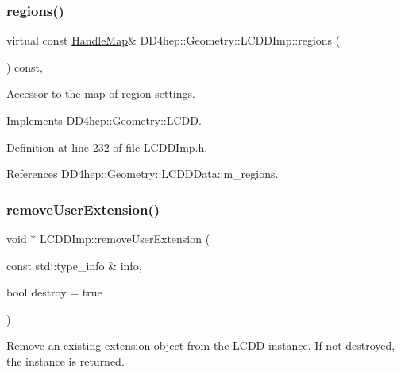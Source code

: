 \subsubsection{\texorpdfstring{regions()}{regions()}}
{\footnotesize\ttfamily virtual const \hyperlink{class_d_d4hep_1_1_geometry_1_1_l_c_d_d_a05cb11e7355772c7b0794bcca59bf477}{Handle\+Map}\& D\+D4hep\+::\+Geometry\+::\+L\+C\+D\+D\+Imp\+::regions (\begin{DoxyParamCaption}{ }\end{DoxyParamCaption}) const\hspace{0.3cm}{\ttfamily [inline]}, {\ttfamily [virtual]}}



Accessor to the map of region settings. 



Implements \hyperlink{class_d_d4hep_1_1_geometry_1_1_l_c_d_d_ab068e5aaa1d76a2348ea74ea3d76f96f}{D\+D4hep\+::\+Geometry\+::\+L\+C\+DD}.



Definition at line 232 of file L\+C\+D\+D\+Imp.\+h.



References D\+D4hep\+::\+Geometry\+::\+L\+C\+D\+D\+Data\+::m\+\_\+regions.

\hypertarget{class_d_d4hep_1_1_geometry_1_1_l_c_d_d_imp_a9e43af7ad956710acab4aead5a41dc13}{}\label{class_d_d4hep_1_1_geometry_1_1_l_c_d_d_imp_a9e43af7ad956710acab4aead5a41dc13} 
\subsubsection{\texorpdfstring{remove\+User\+Extension()}{removeUserExtension()}}
{\footnotesize\ttfamily void $\ast$ L\+C\+D\+D\+Imp\+::remove\+User\+Extension (\begin{DoxyParamCaption}\item[{const std\+::type\+\_\+info \&}]{info,  }\item[{bool}]{destroy = {\ttfamily true} }\end{DoxyParamCaption})\hspace{0.3cm}{\ttfamily [virtual]}}



Remove an existing extension object from the \hyperlink{class_d_d4hep_1_1_geometry_1_1_l_c_d_d}{L\+C\+DD} instance. If not destroyed, the instance is returned. 

